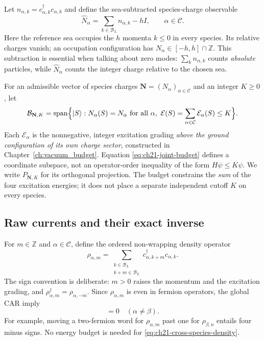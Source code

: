 Let $n_{\alpha,k}=c_{\alpha,k}^\dagger c_{\alpha,k}$ and define the
sea-subtracted species-charge observable
\begin{equation}
  \widehat N_\alpha=\sum_{k\in\mathcal B_L}n_{\alpha,k}-hI,
  \qquad \alpha\in\mathcal C.
  \label{eq:ch21-relative-species-charge}
\end{equation}
Here the reference sea occupies the $h$ momenta $k\leq 0$ in every
species.  Its relative charges vanish; an occupation configuration has
$N_\alpha\in[-h,h]\cap\mathbb Z$.  This subtraction is essential when
talking about zero modes: $\sum_k n_{\alpha,k}$ counts \emph{absolute}
particles, while $\widehat N_\alpha$ counts the integer charge relative
to the chosen sea.

For an admissible vector of species charges
$\mathbf N=(N_\alpha)_{\alpha\in\mathcal C}$ and an integer $K\geq0$, let
\begin{equation}
 \mathcal B_{\mathbf N,K}
  =\operatorname{span}\Bigl\{|S\rangle:
     N_\alpha(S)=N_\alpha\ \text{for all }\alpha,
     \ \mathcal E(S)=\sum_{\alpha\in\mathcal C}\mathcal E_\alpha(S)
          \leq K\Bigr\}.
 \label{eq:ch21-joint-budget}
\end{equation}
Each $\mathcal E_\alpha$ is the nonnegative, integer excitation grading
\emph{above the ground configuration of its own charge sector}, constructed
in Chapter~\ref{ch:vacuum_budget}.  Equation
\eqref{eq:ch21-joint-budget} defines a coordinate subspace, not an
operator-order inequality of the form $H\psi\leq K\psi$.
We write $P_{\mathbf N,K}$ for its orthogonal projection.  The budget
constrains the \emph{sum} of the four excitation energies; it does not
place a separate independent cutoff $K$ on every species.

\subsection*{Raw currents and their exact inverse}

For $m\in\mathbb Z$ and $\alpha\in\mathcal C$, define the ordered
non-wrapping density operator
\begin{equation}
  \rho_{\alpha,m}
   =\sum_{\substack{k\in\mathcal B_L\\k+m\in\mathcal B_L}}
        c_{\alpha,k+m}^{\dagger}c_{\alpha,k}.
  \label{eq:ch21-species-density}
\end{equation}
The sign convention is deliberate: $m>0$ raises the momentum and the
excitation grading, and
$\rho_{\alpha,m}^{\dagger}=\rho_{\alpha,-m}$.  Since
$\rho_{\alpha,m}$ is even in fermion operators, the global CAR imply
\begin{equation}
 [\rho_{\alpha,m},\rho_{\beta,n}]=0\quad(\alpha\ne\beta).
 \label{eq:ch21-cross-species-density}
\end{equation}
For example, moving a two-fermion word for $\rho_{\alpha,m}$ past
one for $\rho_{\beta,n}$ entails four minus signs.  No energy budget is
needed for \eqref{eq:ch21-cross-species-density}.

